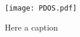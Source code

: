 \chapter{} %
\label{AppendixA} %


\begin{figure}[h]
    \centering
    \texttt{[image: PDOS.pdf]}
    \caption{
        Here a caption 
    }
    \label{fig:pdos-all}
\end{figure}
